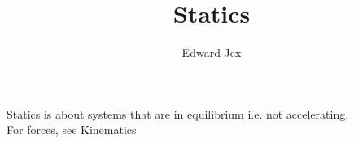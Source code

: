 \documentclass[a4paper,12pt]{article}
\begin{document}
\title{Statics}	
\author{Edward Jex}
\maketitle
Statics is about systems that are in equilibrium i.e. not accelerating. \\
For forces, see Kinematics
\end{document}
